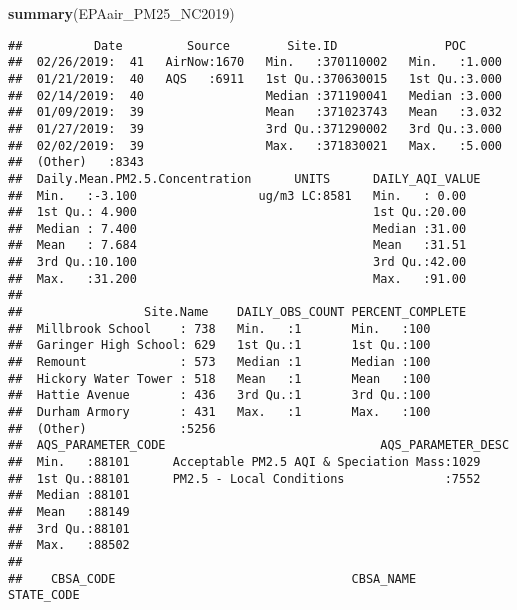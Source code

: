 \documentclass[]{article}
\newenvironment{Shaded}{\begin{snugshade}}{\end{snugshade}}
\newcommand{\KeywordTok}[1]{\textcolor[rgb]{0.13,0.29,0.53}{\textbf{#1}}}
\newcommand{\NormalTok}[1]{#1}
\begin{document}
\begin{Shaded}
\begin{Highlighting}[]
\KeywordTok{summary}\NormalTok{(EPAair_PM25_NC2019)}
\end{Highlighting}
\end{Shaded}

\begin{verbatim}
##          Date         Source        Site.ID               POC       
##  02/26/2019:  41   AirNow:1670   Min.   :370110002   Min.   :1.000  
##  01/21/2019:  40   AQS   :6911   1st Qu.:370630015   1st Qu.:3.000  
##  02/14/2019:  40                 Median :371190041   Median :3.000  
##  01/09/2019:  39                 Mean   :371023743   Mean   :3.032  
##  01/27/2019:  39                 3rd Qu.:371290002   3rd Qu.:3.000  
##  02/02/2019:  39                 Max.   :371830021   Max.   :5.000  
##  (Other)   :8343                                                    
##  Daily.Mean.PM2.5.Concentration      UNITS      DAILY_AQI_VALUE
##  Min.   :-3.100                 ug/m3 LC:8581   Min.   : 0.00  
##  1st Qu.: 4.900                                 1st Qu.:20.00  
##  Median : 7.400                                 Median :31.00  
##  Mean   : 7.684                                 Mean   :31.51  
##  3rd Qu.:10.100                                 3rd Qu.:42.00  
##  Max.   :31.200                                 Max.   :91.00  
##                                                                
##                 Site.Name    DAILY_OBS_COUNT PERCENT_COMPLETE
##  Millbrook School    : 738   Min.   :1       Min.   :100     
##  Garinger High School: 629   1st Qu.:1       1st Qu.:100     
##  Remount             : 573   Median :1       Median :100     
##  Hickory Water Tower : 518   Mean   :1       Mean   :100     
##  Hattie Avenue       : 436   3rd Qu.:1       3rd Qu.:100     
##  Durham Armory       : 431   Max.   :1       Max.   :100     
##  (Other)             :5256                                   
##  AQS_PARAMETER_CODE                              AQS_PARAMETER_DESC
##  Min.   :88101      Acceptable PM2.5 AQI & Speciation Mass:1029    
##  1st Qu.:88101      PM2.5 - Local Conditions              :7552    
##  Median :88101                                                     
##  Mean   :88149                                                     
##  3rd Qu.:88101                                                     
##  Max.   :88502                                                     
##                                                                    
##    CBSA_CODE                                 CBSA_NAME      STATE_CODE

\end{verbatim}
\end{document}
